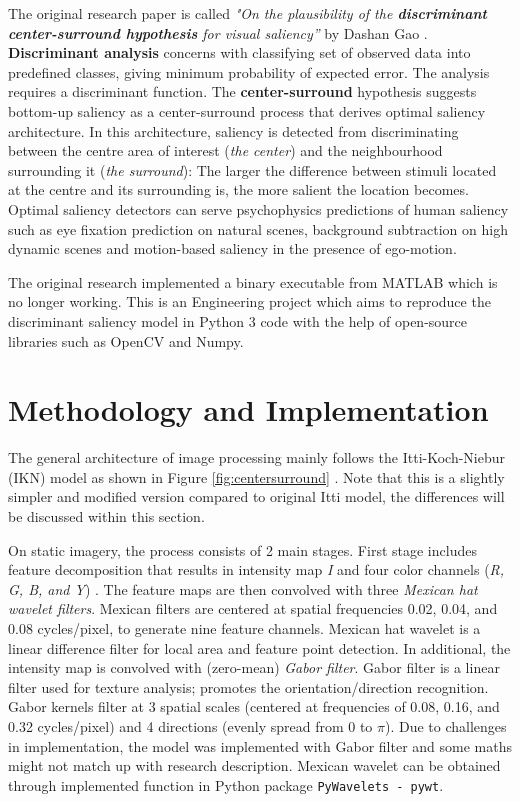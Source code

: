 \documentclass[conference]{IEEEtran}
\begin{document}
The original research paper is called  \textit{"On the plausibility of the \textbf{discriminant center-surround hypothesis} for visual saliency”} by Dashan Gao \cite{Gao_Vasconcelos_2008}. \textbf{Discriminant analysis} concerns with classifying set of observed data into predefined classes, giving minimum probability of expected error. The analysis requires a discriminant function. The \textbf{center-surround} hypothesis suggests bottom-up saliency as a center-surround process that derives optimal saliency architecture. In this architecture, saliency is detected from discriminating between the centre area of interest (\textit{the center}) and the neighbourhood surrounding it (\textit{the surround}): The larger the difference between stimuli located at the centre and its surrounding is, the more salient the location becomes. Optimal saliency detectors can serve psychophysics predictions of human saliency such as eye fixation prediction on natural scenes, background subtraction on high dynamic scenes and motion-based saliency in the presence of ego-motion. 

The original research implemented a binary executable from MATLAB which is no longer working. This is an Engineering project which aims to reproduce the discriminant saliency model in Python 3 code with the help of open-source libraries such as OpenCV and Numpy.

\section{Methodology and Implementation}
The general architecture of image processing mainly follows the Itti-Koch-Niebur (IKN) model as shown in Figure \ref{fig:centersurround} \cite{Xu_2008}. Note that this is a slightly simpler and modified version compared to original Itti model, the differences will be discussed within this section.

On static imagery, the process consists of 2 main stages. First stage includes feature decomposition that results in intensity map \textit{I} and four color channels (\textit{R, G, B, and Y}) \cite{Itti_Koch_1998}. The feature maps are then convolved with three \textit{Mexican hat wavelet filters}. Mexican filters are centered at spatial frequencies 0.02, 0.04, and 0.08 cycles/pixel, to generate nine feature channels. Mexican hat wavelet is a linear difference filter for local area and feature point detection. In additional, the intensity map is convolved with (zero-mean) \textit{Gabor filter}. Gabor filter is a linear filter used for texture analysis; promotes the orientation/direction recognition. Gabor kernels filter at 3 spatial scales (centered at frequencies of 0.08, 0.16, and 0.32 cycles/pixel) and 4 directions (evenly spread from 0 to $\pi$). Due to challenges in implementation, the model was implemented with Gabor filter and some maths might not match up with research description. Mexican wavelet can be obtained through implemented function in Python package \texttt{PyWavelets - pywt}.
\end{document}
